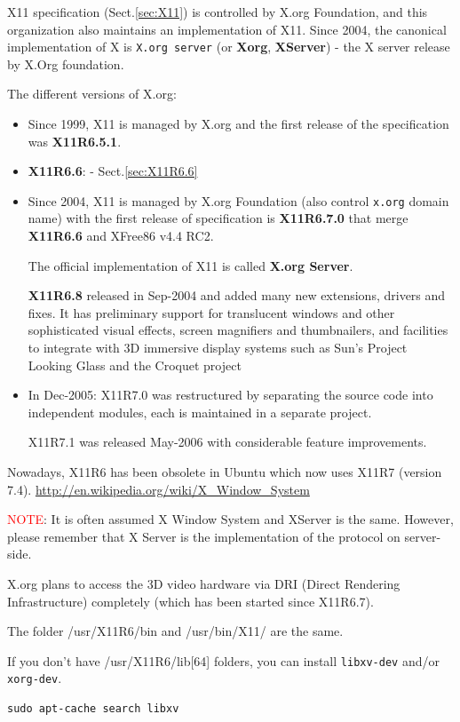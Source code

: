 X11 specification (Sect.\ref{sec:X11}) is controlled by X.org Foundation, and
this organization also maintains an implementation of X11. Since 2004, the
canonical implementation of X is \verb!X.org server! (or {\bf Xorg}, {\bf
XServer}) - the X server release by X.Org foundation.

The different versions of X.org:
\begin{itemize}
  
  \item Since 1999, X11 is managed by X.org and  the first release of the
  specification was {\bf X11R6.5.1}.
  
  \item {\bf X11R6.6}: - Sect.\ref{sec:X11R6.6}
  
  
  
  \item Since 2004, X11 is managed by X.org Foundation (also control
  \verb!x.org! domain name) with the first release of specification is
  {\bf X11R6.7.0} that merge {\bf X11R6.6} and XFree86 v4.4 RC2.
  
  The official implementation of X11 is called {\bf X.org Server}.
    
  {\bf X11R6.8} released in Sep-2004 and added many new extensions, drivers and
  fixes.
  It has preliminary support for translucent windows and other sophisticated
  visual effects, screen magnifiers and thumbnailers, and facilities to
  integrate with 3D immersive display systems such as Sun's Project Looking
  Glass and the Croquet project

   
  \item In Dec-2005: X11R7.0 was restructured by separating the source code into
  independent modules, each is maintained in a separate project.
  
X11R7.1 was released May-2006 with considerable feature improvements.
\end{itemize}

Nowadays, X11R6 has been obsolete in Ubuntu which now uses X11R7 (version 7.4).
\url{http://en.wikipedia.org/wiki/X_Window_System}
  


\textcolor{red}{NOTE}: It is often assumed X Window System and XServer is the
same. However, please remember that X Server is the implementation of the
protocol on server-side.


\begin{framed}
  X.org plans to access the 3D video hardware via DRI
  (Direct Rendering Infrastructure) completely (which has been started
  since X11R6.7). 

  The folder /usr/X11R6/bin and /usr/bin/X11/ are the same. 

  If you don't have /usr/X11R6/lib[64] folders, you can install
  \verb!libxv-dev! and/or \verb!xorg-dev!. 
\begin{verbatim}
sudo apt-cache search libxv
\end{verbatim}
\end{framed}

